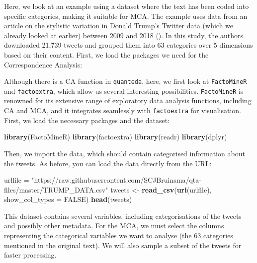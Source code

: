 \documentclass[
]{book}
\newenvironment{Shaded}{\begin{snugshade}}{\end{snugshade}}
\newcommand{\AttributeTok}[1]{\textcolor[rgb]{0.13,0.29,0.53}{#1}}
\newcommand{\ConstantTok}[1]{\textcolor[rgb]{0.56,0.35,0.01}{#1}}
\newcommand{\FunctionTok}[1]{\textcolor[rgb]{0.13,0.29,0.53}{\textbf{#1}}}
\newcommand{\NormalTok}[1]{#1}
\newcommand{\OtherTok}[1]{\textcolor[rgb]{0.56,0.35,0.01}{#1}}
\newcommand{\StringTok}[1]{\textcolor[rgb]{0.31,0.60,0.02}{#1}}
\begin{document}
Here, we look at an example using a dataset where the text has been coded into specific categories, making it suitable for MCA. The example uses data from an article on the stylistic variation in Donald Trump's Twitter data (which we already looked at earlier) between 2009 and 2018 (). In this study, the authors downloaded 21,739 tweets and grouped them into 63 categories over 5 dimensions based on their content. First, we load the packages we need for the Correspondence Analysis:

Although there is a CA function in \texttt{quanteda}, here, we first look at \texttt{FactoMineR} and \texttt{factoextra}, which allow us several interesting possibilities. \texttt{FactoMineR} is renowned for its extensive range of exploratory data analysis functions, including CA and MCA, and it integrates seamlessly with \texttt{factoextra} for visualisation. First, we load the necessary packages and the dataset:

\begin{Shaded}
\begin{Highlighting}[]
\FunctionTok{library}\NormalTok{(FactoMineR)}
\FunctionTok{library}\NormalTok{(factoextra)}
\FunctionTok{library}\NormalTok{(readr)}
\FunctionTok{library}\NormalTok{(dplyr)}
\end{Highlighting}
\end{Shaded}

Then, we import the data, which should contain categorised information about the tweets. As before, you can load the data directly from the URL:

\begin{Shaded}
\begin{Highlighting}[]
\NormalTok{urlfile }\OtherTok{=} \StringTok{"https://raw.githubusercontent.com/SCJBruinsma/qta{-}files/master/TRUMP\_DATA.csv"}
\NormalTok{tweets }\OtherTok{\textless{}{-}} \FunctionTok{read\_csv}\NormalTok{(}\FunctionTok{url}\NormalTok{(urlfile), }\AttributeTok{show\_col\_types =} \ConstantTok{FALSE}\NormalTok{)}
\FunctionTok{head}\NormalTok{(tweets)}
\end{Highlighting}
\end{Shaded}

This dataset contains several variables, including categorisations of the tweets and possibly other metadata. For the MCA, we must select the columns representing the categorical variables we want to analyse (the 63 categories mentioned in the original text). We will also sample a subset of the tweets for faster processing.
\end{document}
